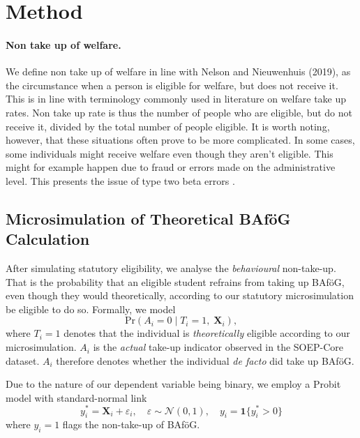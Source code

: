 \section{Method} 

\paragraph{Non take up of welfare.}

We define non take up of welfare in line with Nelson and Nieuwenhuis (2019), as the circumstance when a person is eligible for welfare, but does not receive it. This is in line with terminology commonly used in literature on welfare take up rates. Non take up rate is thus the number of people who are eligible, but do not receive it, divided by the total number of people eligible. It is worth noting, however, that these situations often prove to be more complicated. In some cases, some individuals might receive welfare even though they aren’t eligible. This might for example happen due to fraud or errors made on the administrative level. This presents the issue of type two beta errors \citep{herber_non-take-up_2019, nelson_towards_2021}.

\subsection{Microsimulation of Theoretical BAföG Calculation}
After simulating statutory eligibility, we analyse the \textit{behavioural} non-take-up.
That is the probability that an eligible student refrains from taking up BAföG, even though they would theoretically, according to our statutory microsimulation be eligible to do so. Formally, we model 
\begin{equation}
  \mathrm{Pr}(A_{i} = 0 \mid T_{i} = 1,\; \mathbf{X}_{i}),
\end{equation}
where \( T_{i} = 1 \) denotes that the individual is \textit{theoretically} eligible according to our microsimulation. \( A_{i} \) is the \textit{actual} take-up indicator observed in the SOEP-Core dataset. 
\( A_{i} \) therefore denotes whether the individual \textit{de facto} did take up BAföG. 

Due to the nature of our dependent variable being binary, we employ a Probit model with standard-normal link
\begin{equation}
  y_{i}^* = \mathbf{X}_{i} + \varepsilon_{i}, 
  \quad 
  \varepsilon \sim \mathcal{N}(0,1), 
  \quad 
  y_{i} = \mathbf{1} \{ y_{i}^* > 0 \}
\end{equation}
where \( y_{i} = 1 \) flags the non-take-up of BAföG. 

